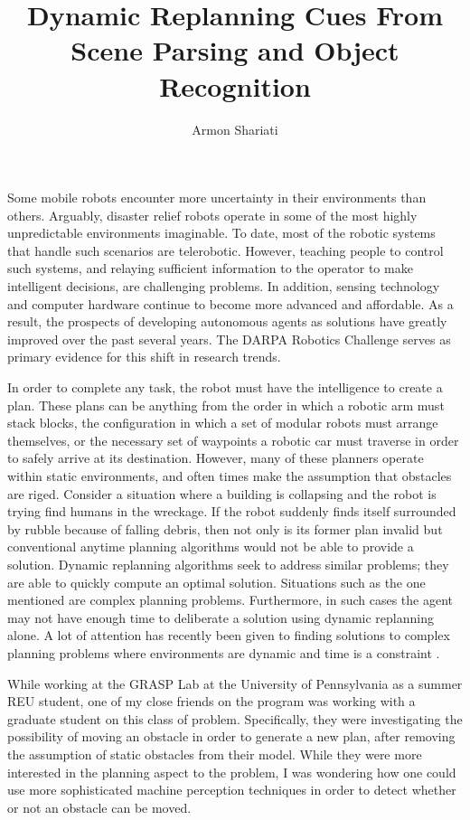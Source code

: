\documentclass[10pt]{article}
\begin{document}
\author{Armon Shariati}
\title{Dynamic Replanning Cues From Scene Parsing and Object Recognition}
\date{}
\maketitle

Some mobile robots encounter more uncertainty in their environments than
others.  Arguably, disaster relief robots operate in some of the most highly
unpredictable environments imaginable. To date, most of the robotic systems
that handle such scenarios are telerobotic. However, teaching people to control
such systems, and relaying sufficient information to the operator to make
intelligent decisions, are challenging problems. In addition, sensing
technology and computer hardware continue to become more advanced and
affordable. As a result, the prospects of developing autonomous agents as
solutions have greatly improved over the past several years. The DARPA Robotics
Challenge serves as primary evidence for this shift in research trends.

In order to complete any task, the robot must have the intelligence to create a
plan. These plans can be anything from the order in which a robotic arm must
stack blocks, the configuration in which a set of modular robots must arrange
themselves, or the necessary set of waypoints a robotic car must traverse in
order to safely arrive at its destination. However, many of these planners
operate within static environments, and often times make the assumption that
obstacles are riged. Consider a situation where a building is collapsing and
the robot is trying find humans in the wreckage. If the robot suddenly finds
itself surrounded by rubble because of falling debris, then not only is its
former plan invalid but conventional anytime planning algorithms would not be
able to provide a solution. Dynamic replanning algorithms seek to address
similar problems; they are able to quickly compute an optimal solution.
Situations such as the one mentioned are complex planning problems.
Furthermore, in such cases the agent may not have enough time to deliberate a
solution using dynamic replanning alone. A lot of attention has recently been
given to finding solutions to complex planning problems where environments are
dynamic and time is a constraint \cite{likhachev}.

While working at the GRASP Lab at the University of Pennsylvania as a summer
REU student, one of my close friends on the program was working with a graduate
student on this class of problem. Specifically, they were investigating the
possibility of moving an obstacle in order to generate a new plan, after
removing the assumption of static obstacles from their model. While they were
more interested in the planning aspect to the problem, I was wondering how one
could use more sophisticated machine perception techniques in order to detect
whether or not an obstacle can be moved.
\end{document}

